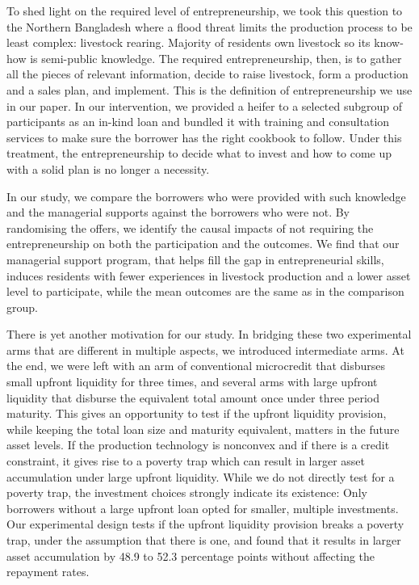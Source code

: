 	To shed light on the required level of entrepreneurship, we took this question to the Northern Bangladesh where a flood threat limits the production process to be least complex: livestock rearing. Majority of residents own livestock so its know-how is semi-public knowledge. The required entrepreneurship, then, is to gather all the pieces of relevant information, decide to raise livestock, form a production and a sales plan, and implement. This is the definition of entrepreneurship we use in our paper. In our intervention, we provided a heifer to a selected subgroup of participants as an in-kind loan and bundled it with training and consultation services to make sure the borrower has the right cookbook to follow. Under this treatment, the entrepreneurship to decide what to invest and how to come up with a solid plan is no longer a necessity.

	In our study, we compare the borrowers who were provided with such knowledge and the managerial supports against the borrowers who were not. By randomising the offers, we identify the causal impacts of not requiring the entrepreneurship on both the participation and the outcomes. We find that our managerial support program, that helps fill the gap in entrepreneurial skills, induces residents with fewer experiences in livestock production and a lower asset level to participate, while the mean outcomes are the same as in the comparison group.%

	There is yet another motivation for our study. In bridging these two experimental arms that are different in multiple aspects, we introduced intermediate arms. At the end, we were left with an arm of conventional microcredit that disburses small upfront liquidity for three times, and several arms with large upfront liquidity that disburse the equivalent total amount once under three period maturity. This gives an opportunity to test if the upfront liquidity provision, while keeping the total loan size and maturity equivalent, matters in the future asset levels. If the production technology is nonconvex and if there is a credit constraint, it gives rise to a poverty trap which can result in larger asset accumulation under large upfront liquidity. While we do not directly test for a poverty trap, the investment choices strongly indicate its existence: Only borrowers without a large upfront loan opted for smaller, multiple investments. Our experimental design tests if the upfront liquidity provision breaks a poverty trap, under the assumption that there is one, and found that it results in larger asset accumulation by 48.9 to 52.3 percentage points without affecting the repayment rates.

